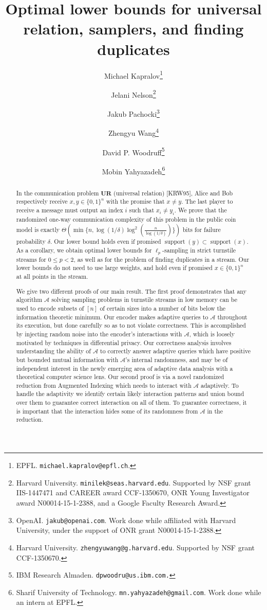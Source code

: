 \documentclass[11pt]{article}
\title{Optimal lower bounds for universal relation, samplers, and finding duplicates}
\author{
  Michael Kapralov\thanks{EPFL. \texttt{michael.kapralov@epfl.ch}.}
  \and Jelani Nelson\thanks{Harvard University. \texttt{minilek@seas.harvard.edu}. Supported by NSF grant IIS-1447471 and
   CAREER award CCF-1350670, ONR Young Investigator award N00014-15-1-2388, and a Google Faculty Research Award.}
  \and Jakub Pachocki\thanks{OpenAI. \texttt{jakub@openai.com}. Work done while affiliated with Harvard University, under the support of ONR grant N00014-15-1-2388.}
  \and Zhengyu Wang\thanks{Harvard University. \texttt{zhengyuwang@g.harvard.edu}. Supported by NSF grant CCF-1350670.}
  \and David P. Woodruff\thanks{IBM Research Almaden. \texttt{dpwoodru@us.ibm.com.}}
  \and Mobin Yahyazadeh\thanks{Sharif University of Technology. \texttt{mn.yahyazadeh@gmail.com}. Work done while an intern at EPFL.}}
\newcommand{\ur}{\mathbf{UR}\xspace}
\begin{document}
\setcounter{page}{0}

\maketitle

\thispagestyle{empty}

\begin{abstract}
In the communication problem $\ur$ (universal relation) [KRW95], Alice and Bob respectively receive $x, y \in\{0,1\}^n$ with the promise that $x\neq y$. The last player to receive a message must output an index $i$ such that $x_i\neq y_i$. We prove that the randomized one-way communication complexity of this problem in the public coin model is exactly $\Theta(\min\{n,\log(1/\delta)\log^2(\frac n{\log(1/\delta)})\})$ bits for failure probability $\delta$. Our lower bound holds even if promised $\mathop{support}(y)\subset \mathop{support}(x)$. As a corollary, we obtain optimal lower bounds for $\ell_p$-sampling in strict turnstile streams for $0\le p < 2$, as well as for the problem of finding duplicates in a stream. Our lower bounds do not need to use large weights, and hold even if promised $x\in\{0,1\}^n$ at all points in the stream. 

We give two different proofs of our main result. The first proof demonstrates that any algorithm $\mathcal A$ solving sampling problems in turnstile streams in low memory can be used to encode subsets of $[n]$ of certain sizes into a number of bits below the information theoretic minimum. Our encoder makes adaptive queries to $\mathcal A$ throughout its execution, but done carefully so as to not violate correctness. This is accomplished by injecting random noise into the encoder's interactions with $\mathcal A$, which is loosely motivated by techniques in differential privacy. Our correctness analysis involves understanding the ability of $\mathcal A$ to correctly answer adaptive queries which have positive but bounded mutual information with $\mathcal A$'s internal randomness, and may be of independent interest in the newly emerging area of adaptive data analysis with a theoretical computer science lens. Our second proof is via a novel randomized reduction from Augmented Indexing \cite{MiltersenNSW98} which needs to interact with $\mathcal A$ adaptively. To handle the adaptivity we identify certain likely interaction patterns and union bound over them to guarantee correct interaction on all of them. To guarantee correctness, it is important that the interaction hides some of its randomness from $\mathcal A$ in the reduction.  


\end{abstract}
\end{document}
